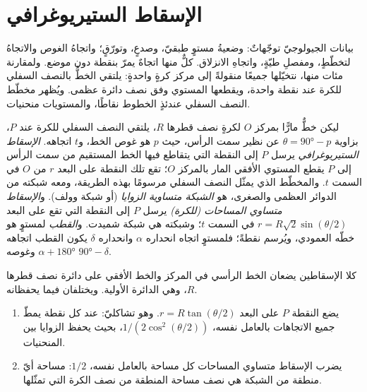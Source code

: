 \section{الإسقاط الستيريوغرافي}\label{sec:b3:structural-analysis:stereo}

بيانات الجيولوجيّ توجّهاتٌ: وضعيةُ مستوٍ طبقيّ،
وصدعٍ، وتورّقٍ؛ واتجاهُ الغوص والاتجاهُ لتخطّطٍ، ومفصلِ طيّةٍ، واتجاهِ
الانزلاق. كلٌّ منها اتجاهٌ يمرّ بنقطة دون موضع. ولمقارنة مئات منها،
نتخيّلها جميعًا منقولةً إلى مركز كرةٍ واحدةٍ:
يلتقي الخطُّ بالنصف السفلي للكرة عند نقطة واحدة، ويقطعها المستوي وفق
نصف دائرة عظمى. ويُظهر مخطّط النصف السفلي عندئذٍ الخطوط نقاطًا،
والمستويات منحنيات.

\begin{definition}\label{def:b3:structural-analysis:stereo}
ليكن خطٌّ مارًّا بمركز $O$ لكرةٍ نصف قطرها $R$، يلتقي النصف السفلي
للكرة عند $P$، بزاوية $\theta = \ang{90} - p$ عن نظير سمت الرأس، حيث
$p$ هو غوص الخط، و$t$ اتجاهه. \emph{الإسقاط
الستيريوغرافي} يرسل $P$ إلى النقطة التي يتقاطع فيها
الخط المستقيم من سمت الرأس إلى $P$ يقطع المستوي الأفقي المار بالمركز
$O$؛ تقع تلك النقطة على البعد $r$ من $O$ في السمت $t$. والمخطّط الذي يمثّل النصف السفلي
مرسومًا بهذه الطريقة، ومعه شبكته من الدوائر العظمى والصغرى، هو
\emph{الشبكة متساوية الزوايا} (أو
شبكة وولف). و\emph{الإسقاط متساوي المساحات (للكرة)}
يرسل $P$ إلى النقطة التي تقع على البعد $r =
R\sqrt2\sin(\theta/2)$ في السمت $t$؛ وشبكته هي شبكة شميدت.
و\emph{القطب} لمستوٍ هو خطّه العمودي، ويُرسم
نقطةً؛ فلمستوٍ اتجاه انحداره $\alpha$ وانحداره $\delta$ يكون القطب
اتجاهه $\alpha + \ang{180}$ وغوصه $\ang{90} - \delta$.
\end{definition}

كلا الإسقاطين يضعان الخط الرأسي في المركز والخط الأفقي على
دائرة نصف قطرها $R$، وهي الدائرة الأولية. ويختلفان فيما يحفظانه.

\begin{theorem}[الإسقاطان]\label{thm:b3:structural-analysis:projections}
\begin{enumerate}[label=(\alph*)]
  \item يضع  النقطة $P$ على البعد $r = R\tan(\theta/2)$. وهو
        تشاكليّ: عند كل نقطة يمطّ جميع الاتجاهات بالعامل نفسه،
        $1/(2\cos^2(\theta/2))$، بحيث يحفظ الزوايا بين
        المنحنيات.
  \item يضرب الإسقاط متساوي المساحات كل مساحة بالعامل نفسه،
        $1/2$: مساحة أيّ منطقة من الشبكة هي نصف مساحة المنطقة
        من نصف الكرة التي تمثّلها.
\end{enumerate}
\end{theorem}


